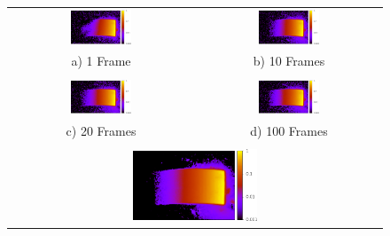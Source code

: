       
   \begin{figure}[H]
    \centering
    \begin{tabular}{cc}
     \includegraphics[width=0.34\textwidth]{../graphics/hdr_beleuchtung/hdr_luminance_logmap_single.png} &
     \includegraphics[width=0.34\textwidth]{../graphics/hdr_beleuchtung/hdr_luminance_logmap_size10.png} \\
     a) 1 Frame& b) 10 Frames \\ 
    & \\
     \includegraphics[width=0.34\textwidth]{../graphics/hdr_beleuchtung/hdr_luminance_logmap_size20.png} &
     \includegraphics[width=0.34\textwidth]{../graphics/hdr_beleuchtung/hdr_luminance_logmap_size100.png} \\
     c) 20 Frames & d) 100 Frames \\
    & \\
   \multicolumn{2}{c}{     \includegraphics[width=0.34\textwidth]{../graphics/hdr_beleuchtung/hdr_luminance_logmap_size100hdr.png}  }\\

\end{tabular}
\end{figure}
